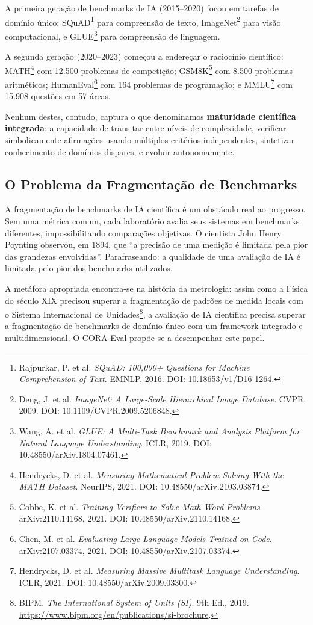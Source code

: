 \documentclass[12pt,a4paper,oneside]{article}
\begin{document}
A primeira geração de benchmarks de IA (2015--2020) focou em tarefas de domínio
único: SQuAD\footnote{Rajpurkar, P. et al. \textit{SQuAD: 100,000+ Questions
for Machine Comprehension of Text}. EMNLP, 2016. DOI: 10.18653/v1/D16-1264.}
para compreensão de texto, ImageNet\footnote{Deng, J. et al. \textit{ImageNet:
A Large-Scale Hierarchical Image Database}. CVPR, 2009. DOI:
10.1109/CVPR.2009.5206848.} para visão computacional, e GLUE\footnote{Wang, A.
et al. \textit{GLUE: A Multi-Task Benchmark and Analysis Platform for Natural
Language Understanding}. ICLR, 2019. DOI: 10.48550/arXiv.1804.07461.} para
compreensão de linguagem.

A segunda geração (2020--2023) começou a endereçar o raciocínio científico:
MATH\footnote{Hendrycks, D. et al. \textit{Measuring Mathematical Problem
Solving With the MATH Dataset}. NeurIPS, 2021. DOI:
10.48550/arXiv.2103.03874.} com 12.500 problemas de competição; GSM8K\footnote{Cobbe, K. et al. \textit{Training Verifiers to Solve Math Word Problems}.
arXiv:2110.14168, 2021. DOI: 10.48550/arXiv.2110.14168.} com 8.500 problemas
aritméticos; HumanEval\footnote{Chen, M. et al. \textit{Evaluating Large
Language Models Trained on Code}. arXiv:2107.03374, 2021. DOI:
10.48550/arXiv.2107.03374.} com 164 problemas de programação; e MMLU\footnote{Hendrycks, D. et al. \textit{Measuring Massive Multitask Language
Understanding}. ICLR, 2021. DOI: 10.48550/arXiv.2009.03300.} com 15.908
questões em 57 áreas.

Nenhum destes, contudo, captura o que denominamos \textbf{maturidade científica
integrada}: a capacidade de transitar entre níveis de complexidade, verificar
simbolicamente afirmações usando múltiplos critérios independentes, sintetizar
conhecimento de domínios díspares, e evoluir autonomamente.

\subsection{O Problema da Fragmentação de Benchmarks}

A fragmentação de benchmarks de IA científica é um obstáculo real ao progresso.
Sem uma métrica comum, cada laboratório avalia seus sistemas em benchmarks
diferentes, impossibilitando comparações objetivas. O cientista John Henry
Poynting observou, em 1894, que ``a precisão de uma medição é limitada pela
pior das grandezas envolvidas''. Parafraseando: a qualidade de uma avaliação
de IA é limitada pelo pior dos benchmarks utilizados.

A metáfora apropriada encontra-se na história da metrologia: assim como a
Física do século XIX precisou superar a fragmentação de padrões de medida
locais com o Sistema Internacional de Unidades\footnote{BIPM. \textit{The
International System of Units (SI)}. 9th Ed., 2019.
\url{https://www.bipm.org/en/publications/si-brochure}.}, a avaliação de IA
científica precisa superar a fragmentação de benchmarks de domínio único com
um framework integrado e multidimensional. O CORA-Eval propõe-se a desempenhar
este papel.
\end{document}
